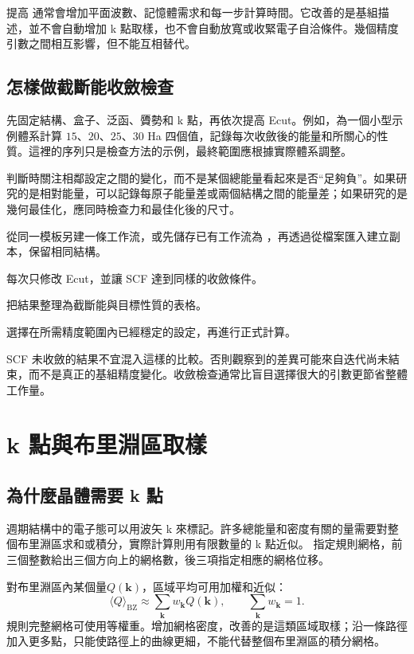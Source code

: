 提高  通常會增加平面波數、記憶體需求和每一步計算時間。它改善的是基組描述，並不會自動增加 k 點取樣，也不會自動放寬或收緊電子自洽條件。幾個精度引數之間相互影響，但不能互相替代。

\subsection{怎樣做截斷能收斂檢查}

先固定結構、盒子、泛函、贗勢和 k 點，再依次提高 Ecut。例如，為一個小型示例體系計算 $15$、$20$、$25$、$30$ Ha 四個值，記錄每次收斂後的能量和所關心的性質。這裡的序列只是檢查方法的示例，最終範圍應根據實際體系調整。

判斷時關注相鄰設定之間的變化，而不是某個總能量看起來是否“足夠負”。如果研究的是相對能量，可以記錄每原子能量差或兩個結構之間的能量差；如果研究的是幾何最佳化，應同時檢查力和最佳化後的尺寸。

\begin{steps}
\item 從同一模板另建一條工作流，或先儲存已有工作流為 ，再透過從檔案匯入建立副本，保留相同結構。
\item 每次只修改 Ecut，並讓 SCF 達到同樣的收斂條件。
\item 把結果整理為截斷能與目標性質的表格。
\item 選擇在所需精度範圍內已經穩定的設定，再進行正式計算。
\end{steps}

SCF 未收斂的結果不宜混入這樣的比較。否則觀察到的差異可能來自迭代尚未結束，而不是真正的基組精度變化。收斂檢查通常比盲目選擇很大的引數更節省整體工作量。

\section{k 點與布里淵區取樣}

\subsection{為什麼晶體需要 k 點}

週期結構中的電子態可以用波矢 k 來標記。許多總能量和密度有關的量需要對整個布里淵區求和或積分，實際計算則用有限數量的 k 點近似。\mbox{} 指定規則網格，前三個整數給出三個方向上的網格數，後三項指定相應的網格位移。


對布里淵區內某個量$Q(\mathbf k)$，區域平均可用加權和近似：
\begin{equation}
  \langle Q\rangle_{\mathrm{BZ}}
      \approx\sum_{\mathbf k}w_{\mathbf k}Q(\mathbf k),
  \qquad \sum_{\mathbf k}w_{\mathbf k}=1.
  \label{eq:k-point-average}
\end{equation}
規則完整網格可使用等權重。增加網格密度，改善的是這類區域取樣；沿一條路徑加入更多點，只能使路徑上的曲線更細，不能代替整個布里淵區的積分網格。

